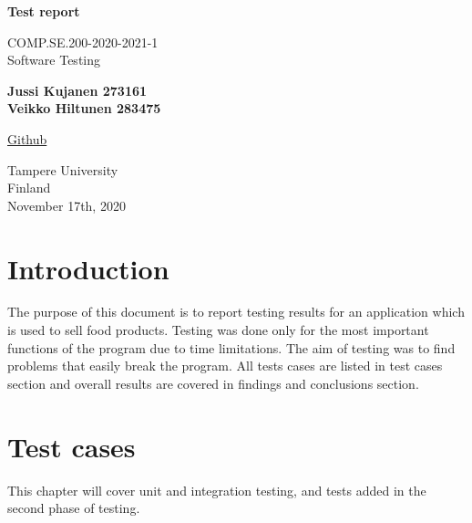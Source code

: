 \documentclass[a4paper, 12pt]{article}
\begin{document}
 
\begin{titlepage}
    \begin{center}
        \vspace*{1cm}
            
        \Huge
        \textbf{Test report}
            
        \vspace{0.5cm}
        \LARGE
        COMP.SE.200-2020-2021-1\\
        Software Testing
            
        \vspace{1.5cm}
            
        \textbf{Jussi Kujanen 273161}
        \\
        \textbf{Veikko Hiltunen 283475}
            
        \vfill
            
        \href{https://github.com/Kujanenj/SoftwareTesting}{Github} \\
            
        \vspace{0.8cm}
            
        \Large
        Tampere University\\
        Finland\\
        November 17th, 2020
            
    \end{center}
\end{titlepage}
 



\newpage
\thispagestyle{empty}
\tableofcontents

\newpage
\clearpage
{} 

\section{Introduction}

The purpose of this document is to report testing results for an application which is used to sell food products. Testing was done only for the most important functions of the program due to time limitations. The aim of testing was to find problems that easily break the program. All tests cases are listed in test cases section and overall results are covered in findings and conclusions section.

\section{Test cases}
This chapter will cover unit and integration testing, and tests added in the second phase of testing.
\end{document}
